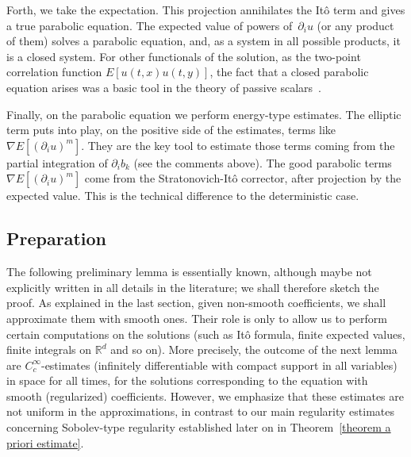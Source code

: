 \documentclass[a4paper,10pt]{article}
\newcommand\1{\mathbbm{1}}
\numberwithin{equation}{section}
\begin{document}
Forth, we take the expectation. This projection annihilates the It\^{o} term and gives a true parabolic equation. The expected value of powers of~$\partial_{i}u$ (or any product of them) solves a parabolic equation, and, as a system in all possible products, it is a closed system. For other functionals of the solution, as the two-point correlation function $E[u(t,x)  u(t,y)]$, the fact that a closed parabolic equation arises was a basic tool in the theory of passive scalars~\cite{GaKuVe}.

Finally, on the parabolic equation we perform energy-type estimates. The elliptic term puts into play, on the positive side of the estimates, terms like
$\nabla E[ (\partial_{i}u)^{m}]$. They are the key tool to estimate those terms coming from the partial integration of $\partial_{i}b_{k}$ (see the comments above). The good parabolic terms $\nabla E[(\partial_{i}u)^{m}]$ come from the Stratonovich-It\^{o} corrector, after projection by the expected value.  This is the technical difference to the deterministic case. 

\subsection{Preparation}

The following preliminary lemma is essentially known, although maybe not explicitly written in all details in the literature; we shall therefore sketch the proof. As
explained in the last section, given non-smooth coefficients, we shall approximate them with smooth ones. Their role is only to allow us to perform certain computations on the solutions (such as It\^{o} formula, finite expected values, finite integrals on $\mathbb{R}^{d}$ and so on). More precisely, the outcome of the next lemma are $C_{c}^{\infty}$-estimates (infinitely differentiable with compact support in all variables) in space for all times, for the solutions corresponding to the equation with smooth (regularized) coefficients. However, we emphasize that these estimates are not uniform in the approximations, in contrast to our main regularity estimates concerning Sobolev-type regularity established later on in Theorem~\ref{theorem a priori estimate}. 
\end{document}
